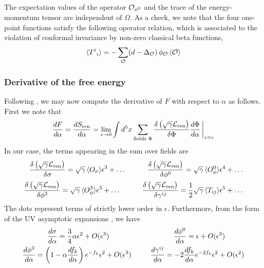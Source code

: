 \documentclass[12pt]{article}
\begin{document}
The expectation values of the operator ${\cal O}_{\phi^3}$ and the trace of the energy-momentum tensor are independent of $\Omega$. As a check, we note that the four one-point functions satisfy the following operator relation, which is associated to the violation of conformal invariance by non-zero classical beta functions,
\begin{eqnarray}
\langle{T^i}_i\rangle = -\sum_{\cal O}(d-\Delta_{\cal O})\,\phi_{\cal O}\,\langle{\cal O}\rangle 
\end{eqnarray}
\subsubsection{Derivative of the free energy}
Following , we may now compute the derivative of $F$ with respect to $\alpha$ as follows. First we note that
\begin{eqnarray}
{d F \over d \alpha} = {d S_{\mathrm{ren}} \over d\alpha} =\lim_{\epsilon \rightarrow 0} \int d^5x \sum_{\mathrm{fields}\,\, \Phi} {\delta \left(\sqrt{\gamma} {\cal L}_{\mathrm{ren}}\right) \over \delta \Phi }{d \Phi \over d \alpha}\,\bigg|_{z = \epsilon}
\end{eqnarray}
In our case, the terms appearing in the sum over fields are
\begin{align}
{\delta \left(\sqrt{\gamma} {\cal L}_{\mathrm{ren}}\right) \over \delta \sigma } =  \sqrt{\gamma}\,  \langle O_\sigma \rangle \epsilon^3 + \dots~~~~~~~~~
{\delta \left(\sqrt{\gamma} {\cal L}_{\mathrm{ren}}\right) \over \delta \phi^0 }  = \sqrt{\gamma} \, \langle O_\phi^0 \rangle \epsilon^4 + \dots
\nonumber\\
{\delta \left(\sqrt{\gamma} {\cal L}_{\mathrm{ren}}\right) \over \delta \phi^3 } = \sqrt{\gamma}\,  \langle O_\phi^3 \rangle \epsilon^3+ \dots~~~~~~~~~
{\delta \left(\sqrt{\gamma} {\cal L}_{\mathrm{ren}}\right) \over \delta \gamma^{ij} } = {1\over 2}  \sqrt{\gamma}\, \langle T_{ij} \rangle  \epsilon^5+ \dots
\end{align}
The dots represent terms of strictly lower order in $\epsilon$. Furthermore, from the form of the UV asymptotic expansions , we have  
\begin{align}
{d\sigma \over d \alpha} =  {3 \over 4}\alpha \epsilon^2 + O(\epsilon^3)~~~~~~~~~~~~~~~~~~~~~~~~~~~
{d\phi^0 \over d \alpha} = \epsilon + O(\epsilon^3)~~~~~~~~\nonumber\\
{d\phi^3 \over d \alpha} = \left(1- \alpha {d f_k \over d \alpha}\right)e^{-f_k}\epsilon^2 + O(\epsilon^3)~~~~~~~~
\frac{d\gamma^{ij}}{d\alpha} = -2\frac{df_k}{d\alpha}e^{-2f_k}\epsilon^2 + O(\epsilon^2)
\end{align}
\end{document}
